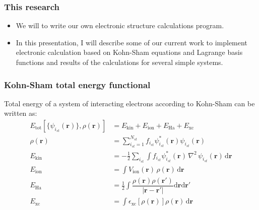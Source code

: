 \documentclass[10pt,t]{beamer}
\begin{document}
\begin{frame}[c]
\frametitle{This research}
  
\begin{itemize}
\item We will to write our own electronic structure calculations program.

\item In this presentation, I will describe some of our current work to implement
electronic calculation based on
{\color{blue}Kohn-Sham equations} and {\color{blue}Lagrange basis functions}
and results of the calculations for
{\color{blue}several simple systems}.
\end{itemize}


\end{frame}




\begin{frame}[c]
\frametitle{Kohn-Sham total energy functional}

Total energy of a system of interacting electrons according to Kohn-Sham
can be written as:
\begin{align*}
E_{\mathrm{tot}}\left[\{\psi_{i_{st}}(\mathbf{r})\},\rho(\mathbf{r})\right] & =
E_{\mathrm{kin}} + E_{\mathrm{ion}} + E_{\mathrm{Ha}} + E_{\mathrm{xc}} \\
%
\rho(\mathbf{r}) & = \sum_{i_{st} = 1}^{N_{st}} f_{i_{st}} \psi^{*}_{i_{st}}(\mathbf{r})
\psi_{i_{st}}(\mathbf{r}) \\
%
E_{\mathrm{kin}} & = -\frac{1}{2}\sum_{i_{st}}
\int f_{i_{st}}
\psi_{i_{st}}^{*}(\mathbf{r})\,\nabla^2\,\psi_{i_{st}}(\mathbf{r})
\,\mathrm{d}\mathbf{r} \\
%
E_{\mathrm{ion}} & = \int V_{\mathrm{ion}}(\mathbf{r})\, \rho(\mathbf{r})\,
\mathrm{d}\mathbf{r} \\
%
E_{\mathrm{Ha}} & = \frac{1}{2} \int 
\dfrac{\rho(\mathbf{r})\rho(\mathbf{r}')}
{\left|\mathbf{r} - \mathbf{r}'\right|}
\mathrm{d}\mathbf{r}\mathrm{d}\mathbf{r}' \\
%
E_{\mathrm{xc}} & = \int \epsilon_{\mathrm{xc}}\left[\rho(\mathbf{r})\right]
\rho(\mathbf{r})\,\mathrm{d}\mathbf{r}
\end{align*}

\end{frame}
\end{document}
